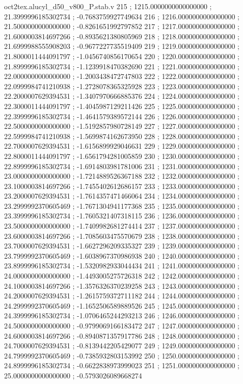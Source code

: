 \begin{filecontents}[overwrite]{oct2tex.alucyl_d50_v800_P.stab.v}
215 ; 1215.0000000000000000 ; 21.3999996185302734 ; -0.7683759927749634
216 ; 1216.0000000000000000 ; 21.5000000000000000 ; -0.8261651992797852
217 ; 1217.0000000000000000 ; 21.6000003814697266 ; -0.8935621380805969
218 ; 1218.0000000000000000 ; 21.6999988555908203 ; -0.9677227735519409
219 ; 1219.0000000000000000 ; 21.8000011444091797 ; -1.0456740856170654
220 ; 1220.0000000000000000 ; 21.8999996185302734 ; -1.1239918470382690
221 ; 1221.0000000000000000 ; 22.0000000000000000 ; -1.2003438472747803
222 ; 1222.0000000000000000 ; 22.0999984741210938 ; -1.2728078365325928
223 ; 1223.0000000000000000 ; 22.2000007629394531 ; -1.3407970666885376
224 ; 1224.0000000000000000 ; 22.3000011444091797 ; -1.4045987129211426
225 ; 1225.0000000000000000 ; 22.3999996185302734 ; -1.4641579389572144
226 ; 1226.0000000000000000 ; 22.5000000000000000 ; -1.5192857980728149
227 ; 1227.0000000000000000 ; 22.5999984741210938 ; -1.5699874162673950
228 ; 1228.0000000000000000 ; 22.7000007629394531 ; -1.6156899929046631
229 ; 1229.0000000000000000 ; 22.8000011444091797 ; -1.6561794281005859
230 ; 1230.0000000000000000 ; 22.8999996185302734 ; -1.6914803981781006
231 ; 1231.0000000000000000 ; 23.0000000000000000 ; -1.7214889526367188
232 ; 1232.0000000000000000 ; 23.1000003814697266 ; -1.7455402612686157
233 ; 1233.0000000000000000 ; 23.2000007629394531 ; -1.7614357471466064
234 ; 1234.0000000000000000 ; 23.2999992370605469 ; -1.7671304941177368
235 ; 1235.0000000000000000 ; 23.3999996185302734 ; -1.7605321407318115
236 ; 1236.0000000000000000 ; 23.5000000000000000 ; -1.7409982681274414
237 ; 1237.0000000000000000 ; 23.6000003814697266 ; -1.7085603475570679
238 ; 1238.0000000000000000 ; 23.7000007629394531 ; -1.6627296209335327
239 ; 1239.0000000000000000 ; 23.7999992370605469 ; -1.6038967370986938
240 ; 1240.0000000000000000 ; 23.8999996185302734 ; -1.5320982933044434
241 ; 1241.0000000000000000 ; 24.0000000000000000 ; -1.4493005275726318
242 ; 1242.0000000000000000 ; 24.1000003814697266 ; -1.3576326370239258
243 ; 1243.0000000000000000 ; 24.2000007629394531 ; -1.2615759372711182
244 ; 1244.0000000000000000 ; 24.2999992370605469 ; -1.1652506589889526
245 ; 1245.0000000000000000 ; 24.3999996185302734 ; -1.0706465244293213
246 ; 1246.0000000000000000 ; 24.5000000000000000 ; -0.9799069166183472
247 ; 1247.0000000000000000 ; 24.6000003814697266 ; -0.8940871357917786
248 ; 1248.0000000000000000 ; 24.7000007629394531 ; -0.8139442205429077
249 ; 1249.0000000000000000 ; 24.7999992370605469 ; -0.7385932803153992
250 ; 1250.0000000000000000 ; 24.8999996185302734 ; -0.6622838973999023
251 ; 1251.0000000000000000 ; 25.0000000000000000 ; -0.5793026089668274

\end{filecontents}
